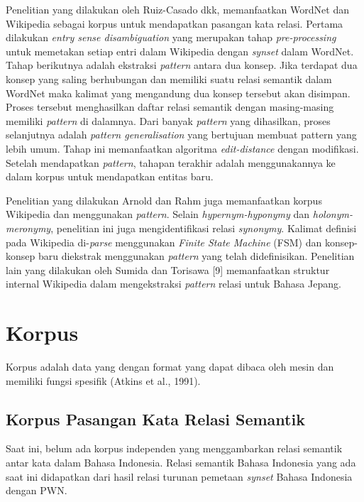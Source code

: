 Penelitian yang dilakukan oleh Ruiz-Casado dkk, memanfaatkan WordNet dan Wikipedia sebagai korpus untuk mendapatkan pasangan kata relasi. Pertama dilakukan \textit{entry sense disambiguation} yang merupakan tahap \textit{pre-processing} untuk memetakan setiap entri dalam Wikipedia dengan \textit{synset} dalam WordNet. Tahap berikutnya adalah ekstraksi \textit{pattern} antara dua konsep. Jika terdapat dua konsep yang saling berhubungan dan memiliki suatu relasi semantik dalam WordNet maka kalimat yang mengandung dua konsep tersebut akan disimpan. Proses tersebut menghasilkan daftar relasi semantik dengan masing-masing memiliki \textit{pattern} di dalamnya. Dari banyak \textit{pattern} yang dihasilkan, proses selanjutnya adalah \textit{pattern generalisation} yang bertujuan membuat pattern yang lebih umum. Tahap ini memanfaatkan algoritma \textit{edit-distance} dengan modifikasi. Setelah mendapatkan \textit{pattern}, tahapan terakhir adalah menggunakannya ke dalam korpus untuk mendapatkan entitas baru.

Penelitian yang dilakukan Arnold dan Rahm juga memanfaatkan korpus Wikipedia dan menggunakan \textit{pattern}. Selain \textit{hypernym-hyponymy} dan \textit{holonym-meronymy}, penelitian ini juga mengidentifikasi relasi \textit{synonymy}. Kalimat definisi pada Wikipedia di-\textit{parse} menggunakan \textit{Finite State Machine} (FSM) dan konsep-konsep baru diekstrak menggunakan \textit{pattern} yang telah didefinisikan. Penelitian lain yang dilakukan oleh Sumida dan Torisawa [9] memanfaatkan struktur internal Wikipedia dalam mengekstraksi \textit{pattern} relasi untuk Bahasa Jepang. 

\section{Korpus}
Korpus adalah data yang dengan format yang dapat dibaca oleh mesin dan memiliki fungsi spesifik (Atkins et al., 1991).

\subsection{Korpus Pasangan Kata Relasi Semantik}
Saat ini, belum ada korpus independen yang menggambarkan relasi semantik antar kata dalam Bahasa Indonesia. Relasi semantik Bahasa Indonesia yang ada saat ini didapatkan dari hasil relasi turunan pemetaan \textit{synset} Bahasa Indonesia dengan PWN. 


